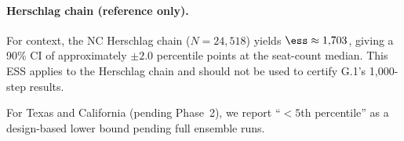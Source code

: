 \paragraph{Herschlag chain (reference only).}
For context, the NC Herschlag chain ($N = 24{,}518$) yields
$\ess \approx 1{,}703$, giving a 90\% CI of approximately
$\pm 2.0$ percentile points at the seat-count median.
This ESS applies to the Herschlag chain and should not be used to
certify G.1's 1{,}000-step results.

For Texas and California (pending Phase~2), we report ``$< 5$th percentile''
as a design-based lower bound pending full ensemble runs.
